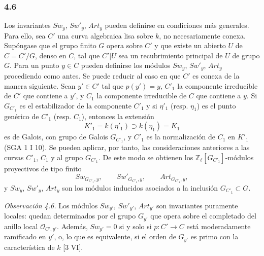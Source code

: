 \subsubsection*{4.6}

Los invariantes $Sw_y$, $Sw'_y$, $Art_y$ pueden definirse en condiciones más generales. Para ello, sea $C'$ una curva algebraica lisa sobre $k$, no necesariamente conexa. Supóngase que el grupo finito $G$ opera sobre $C'$ y que existe un abierto $U$ de $C=C'/G$, denso en $C$, tal que $C'|U$ sea un recubrimiento principal de $U$ de grupo $G$. Para un punto $y\in C$ pueden definirse los módulos $Sw_y$, $Sw'_y$, $Art_y$ procediendo como antes. Se puede reducir al caso en que $C'$ es conexa de la manera siguiente. Sean $y'\in C'$ tal que $p(y')=y$, $C'_1$ la componente irreducible de $C'$ que contiene a $y'$, y $C_1$ la componente irreducible de $C$ que contiene a $y$. Si $G_{C'_1}$ es el estabilizador de la componente $C'_1$ y si $\eta'_1$ (resp. $\eta_1$) es el punto genérico de $C'_1$ (resp. $C_1$), entonces la extensión
\[
K'_1=k(\eta'_1)\supset k(\eta_1)=K_1
\]
es de Galois, con grupo de Galois $G_{C'_1}$, y $C'_1$ es la normalización de $C_1$ en $K'_1$ (SGA 1 I 10). Se pueden aplicar, por tanto, las consideraciones anteriores a las curvas $C'_1$, $C_1$ y al grupo $G_{C'_1}$. De este modo se obtienen los $\mathbb Z_\ell[G_{C'_1}]$-módulos proyectivos de tipo finito
\[
Sw_{G_{C'_1},y},\qquad Sw'_{G_{C'_1},y},\qquad Art_{G_{C'_1},y},
\]
y $Sw_y$, $Sw'_y$, $Art_y$ son los módulos inducidos asociados a la inclusión $G_{C'_1}\subset G$.

\textit{Observación 4.6.} Los módulos $Sw_{y'}$, $Sw'_{y'}$, $Art_{y'}$ son invariantes puramente locales: quedan determinados por el grupo $G_{y'}$ que opera sobre el completado del anillo local $\mathcal O_{C',y'}$. Además, $Sw_{y'}=0$ si y solo si $p:C'\to C$ está moderadamente ramificado en $y'$, o, lo que es equivalente, si el orden de $G_{y'}$ es primo con la característica de $k$ [3 VI].
